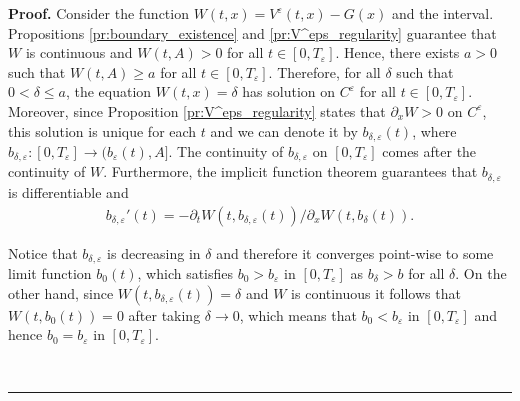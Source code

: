 \documentclass{tufte-handout}
\newenvironment{pf}[1][Proof]{\textbf{#1.} }{\ \rule{0.5em}{0.5em}}
\begin{document}
	\begin{pf}
		Consider the function $W(t, x) = V^\varepsilon(t, x) - G(x)$ and the interval. Propositions \ref{pr:boundary_existence} and \ref{pr:V^eps_regularity} guarantee that $W$ is continuous and $W(t, A) > 0$ for all $t\in [0, T_\varepsilon]$. Hence, there exists $a > 0$ such that $W(t, A) \geq a$ for all $t\in [0, T_\varepsilon]$. Therefore, for all $\delta$ such that $0 < \delta \leq a$, the equation $W(t, x) = \delta$ has solution on $C^\varepsilon$ for all $t\in [0, T_\varepsilon]$. Moreover, since Proposition \ref{pr:V^eps_regularity} states that $\partial_x W > 0$ on $C^\varepsilon$, this solution is unique for each $t$ and we can denote it by $b_{\delta, \varepsilon}(t)$, where  $b_{\delta, \varepsilon}:[0, T_\varepsilon]\rightarrow (b_\varepsilon(t), A]$. The continuity of $b_{\delta, \varepsilon}$ on $[0, T_\varepsilon]$ comes after the continuity of $W$. Furthermore, the implicit function theorem guarantees that $b_{\delta, \varepsilon}$ is differentiable and  
		\begin{align}\label{eq:b_delta'}
		b_{\delta, \varepsilon}'(t) = -\partial_t W(t, b_{\delta, \varepsilon}(t)) / \partial_x W(t, b_\delta(t)).
		\end{align}
		
		Notice that $b_{\delta, \varepsilon}$ is decreasing in $\delta$ and therefore it converges point-wise to some limit function $b_0(t)$, which satisfies $b_0 > b_\varepsilon$ in $[0, T_\varepsilon]$ as $b_\delta > b$ for all $\delta$. On the other hand, since $W(t, b_{\delta, \varepsilon}(t)) = \delta$ and $W$ is continuous it follows that $W(t, b_0(t)) = 0$ after taking $\delta\rightarrow 0$, which means that $b_0 < b_\varepsilon$ in $[0, T_\varepsilon]$ and hence $b_0 = b_\varepsilon$ in $[0, T_\varepsilon]$.
		

\end{pf}
\end{document}
